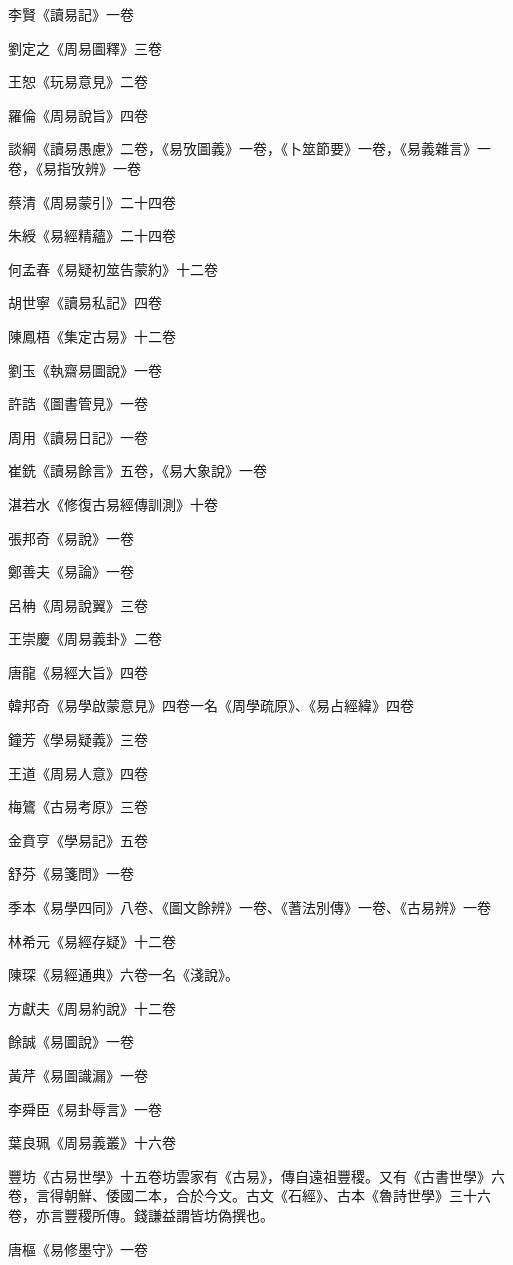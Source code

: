 李賢《讀易記》一卷

劉定之《周易圖釋》三卷

王恕《玩易意見》二卷

羅倫《周易說旨》四卷

談綱《讀易愚慮》二卷，《易攷圖義》一卷，《卜筮節要》一卷，《易義雜言》一卷，《易指攷辨》一卷

蔡清《周易蒙引》二十四卷

朱綬《易經精蘊》二十四卷

何孟春《易疑初筮告蒙約》十二卷

胡世寧《讀易私記》四卷

陳鳳梧《集定古易》十二卷

劉玉《執齋易圖說》一卷

許誥《圖書管見》一卷

周用《讀易日記》一卷

崔銑《讀易餘言》五卷，《易大象說》一卷

湛若水《修復古易經傳訓測》十卷

張邦奇《易說》一卷

鄭善夫《易論》一卷

呂柟《周易說翼》三卷

王崇慶《周易義卦》二卷

唐龍《易經大旨》四卷

韓邦奇《易學啟蒙意見》四卷一名《周學疏原》、《易占經緯》四卷

鐘芳《學易疑義》三卷

王道《周易人意》四卷

梅鷟《古易考原》三卷

金賁亨《學易記》五卷

舒芬《易箋問》一卷

季本《易學四同》八卷、《圖文餘辨》一卷、《蓍法別傳》一卷、《古易辨》一卷

林希元《易經存疑》十二卷

陳琛《易經通典》六卷一名《淺說》。

方獻夫《周易約說》十二卷

餘誠《易圖說》一卷

黃芹《易圖識漏》一卷

李舜臣《易卦辱言》一卷

葉良珮《周易義叢》十六卷

豐坊《古易世學》十五卷坊雲家有《古易》，傳自遠祖豐稷。又有《古書世學》六卷，言得朝鮮、倭國二本，合於今文。古文《石經》、古本《魯詩世學》三十六卷，亦言豐稷所傳。錢謙益謂皆坊偽撰也。

唐樞《易修墨守》一卷

